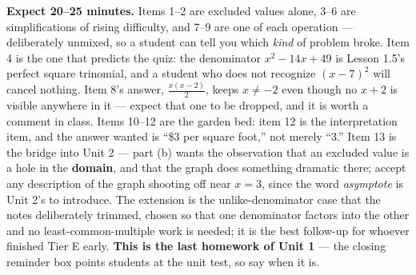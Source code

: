 \documentclass[10pt]{article}
\begin{document}
\begin{teachernote}[Homework]
    \textbf{Expect 20--25 minutes.} Items 1--2 are excluded values alone, 3--6 are simplifications
    of rising difficulty, and 7--9 are one of each operation --- deliberately unmixed, so a student
    can tell you which \emph{kind} of problem broke. Item 4 is the one that predicts the quiz: the
    denominator $x^2-14x+49$ is Lesson 1.5's perfect square trinomial, and a student who does not
    recognize $(x-7)^2$ will cancel nothing. Item 8's answer, $\tfrac{x(x-2)}{2}$, keeps $x \ne -2$
    even though no $x+2$ is visible anywhere in it --- expect that one to be dropped, and it is
    worth a comment in class. Items 10--12 are the garden bed: item 12 is the interpretation item,
    and the answer wanted is ``\$3 per square foot,'' not merely ``$3$.'' Item 13 is the bridge into
    Unit 2 --- part (b) wants the observation that an excluded value is a hole in the
    \textbf{domain}, and that the graph does something dramatic there; accept any description of the
    graph shooting off near $x=3$, since the word \emph{asymptote} is Unit 2's to introduce. The
    extension is the unlike-denominator case that the notes deliberately trimmed, chosen so that one
    denominator factors into the other and no least-common-multiple work is needed; it is the best
    follow-up for whoever finished Tier E early. \textbf{This is the last homework of Unit 1} --- the
    closing reminder box points students at the unit test, so say when it is.
\end{teachernote}
\end{document}
